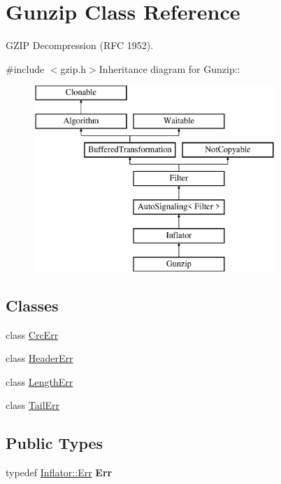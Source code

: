 \hypertarget{class_gunzip}{
\section{Gunzip Class Reference}
\label{class_gunzip}
}


GZIP Decompression (RFC 1952).  


{\ttfamily \#include $<$gzip.h$>$}Inheritance diagram for Gunzip::\begin{figure}[H]
\begin{center}
\leavevmode
\includegraphics[height=7cm]{class_gunzip}
\end{center}
\end{figure}
\subsection*{Classes}
\begin{DoxyCompactItemize}
\item 
class \hyperlink{class_gunzip_1_1_crc_err}{CrcErr}
\item 
class \hyperlink{class_gunzip_1_1_header_err}{HeaderErr}
\item 
class \hyperlink{class_gunzip_1_1_length_err}{LengthErr}
\item 
class \hyperlink{class_gunzip_1_1_tail_err}{TailErr}
\end{DoxyCompactItemize}
\subsection*{Public Types}
\begin{DoxyCompactItemize}
\item 
\hypertarget{class_gunzip_a8fb9515d8a5f03dc0ff1f8df25b9734c}{
typedef \hyperlink{class_inflator_1_1_err}{Inflator::Err} {\bfseries Err}}
\label{class_gunzip_a8fb9515d8a5f03dc0ff1f8df25b9734c}

\end{DoxyCompactItemize}
